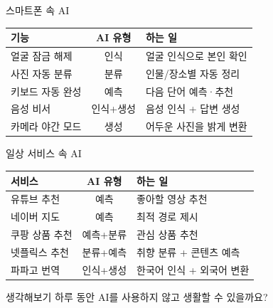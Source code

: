 \documentclass[aspectratio=169]{beamer}
\begin{document}
\begin{frame}{스마트폰 속 AI}
\begin{center}
\begin{tabular}{|p{2.5cm}|c|p{6cm}|}
\hline
\rowcolor{tableheader}
\textbf{기능} & \textbf{AI 유형} & \textbf{하는 일} \\
\hline
얼굴 잠금 해제 & 인식 & 얼굴 인식으로 본인 확인 \\
\hline
사진 자동 분류 & 분류 & 인물/장소별 자동 정리 \\
\hline
키보드 자동 완성 & 예측 & 다음 단어 예측·추천 \\
\hline
음성 비서 & 인식+생성 & 음성 인식 + 답변 생성 \\
\hline
카메라 야간 모드 & 생성 & 어두운 사진을 밝게 변환 \\
\hline
\end{tabular}
\end{center}
\end{frame}

\begin{frame}{일상 서비스 속 AI}
\begin{center}
\begin{tabular}{|p{2.5cm}|c|p{6cm}|}
\hline
\rowcolor{tableheader}
\textbf{서비스} & \textbf{AI 유형} & \textbf{하는 일} \\
\hline
유튜브 추천 & 예측 & 좋아할 영상 추천 \\
\hline
네이버 지도 & 예측 & 최적 경로 제시 \\
\hline
쿠팡 상품 추천 & 예측+분류 & 관심 상품 추천 \\
\hline
넷플릭스 추천 & 분류+예측 & 취향 분류 + 콘텐츠 예측 \\
\hline
파파고 번역 & 인식+생성 & 한국어 인식 + 외국어 변환 \\
\hline
\end{tabular}
\end{center}
\vspace{0.3cm}
\begin{alertblock}{ 생각해보기}
하루 동안 AI를 사용하지 않고 생활할 수 있을까요?
\end{alertblock}
\end{frame}
\end{document}
